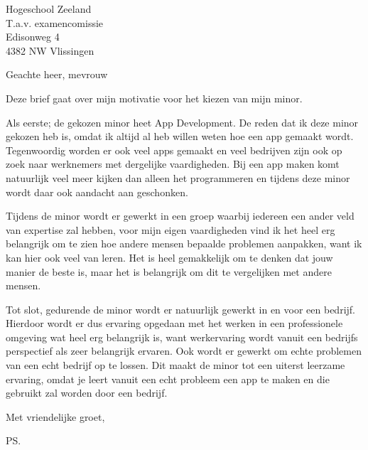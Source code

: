 \documentclass{letter}
\begin{document}
\begin{letter}{Hogeschool Zeeland \\ T.a.v. examencomissie \\ Edisonweg 4 \\ 4382 NW Vlissingen}

\opening{Geachte heer, mevrouw}

Deze brief gaat over mijn motivatie voor het kiezen van mijn minor.

Als eerste; de gekozen minor heet App Development. De reden dat ik deze minor gekozen heb is, omdat ik altijd al heb willen weten hoe een app gemaakt wordt. Tegenwoordig worden er ook veel apps gemaakt en veel bedrijven zijn ook op zoek naar werknemers met dergelijke vaardigheden. Bij een app maken komt natuurlijk veel meer kijken dan alleen het programmeren en tijdens deze minor wordt daar ook aandacht aan geschonken.

\newline

Tijdens de minor wordt er gewerkt in een groep waarbij iedereen een ander veld van expertise zal hebben, voor mijn eigen vaardigheden vind ik het heel erg belangrijk om te zien hoe andere mensen bepaalde problemen aanpakken, want ik kan hier ook veel van leren. Het is heel gemakkelijk om te denken dat jouw manier de beste is, maar het is belangrijk om dit te vergelijken met andere mensen.

\newline

Tot slot, gedurende de minor wordt er natuurlijk gewerkt in en voor een bedrijf. Hierdoor wordt er dus ervaring opgedaan met het werken in een professionele omgeving wat heel erg belangrijk is, want werkervaring wordt vanuit een bedrijfs perspectief als zeer belangrijk ervaren. Ook wordt er gewerkt om echte problemen van een echt bedrijf op te lossen. Dit maakt de minor tot een uiterst leerzame ervaring, omdat je leert vanuit een echt probleem een app te maken en die gebruikt zal worden door een bedrijf.


\closing{Met vriendelijke groet, }
\ps

\end{letter}
\end{document}
